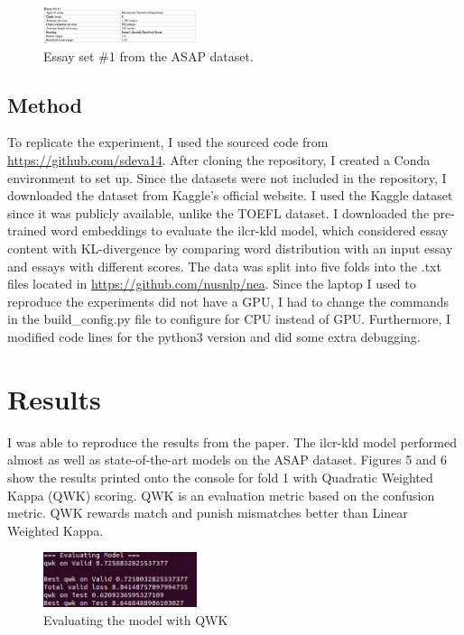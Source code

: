 \documentclass[11pt]{article}
\begin{document}
\begin{figure}
\centering
\includegraphics[width=0.4\textwidth]{essay_set.png}
\caption{Essay set \#1 from the ASAP dataset.}
\end{figure}

\subsection{Method}
To replicate the experiment, I used the sourced code from \url{https://github.com/sdeva14}.
After cloning the repository, I created a Conda environment to set up. Since the datasets were not included in the repository, I downloaded the dataset from Kaggle’s official website. I used the Kaggle dataset since it was publicly available, unlike the TOEFL dataset. I downloaded the pre-trained word embeddings to evaluate the ilcr-kld model, which considered essay content with KL-divergence by comparing word distribution with an input essay and essays with different scores. The data was split into five folds into the .txt files located in \url{https://github.com/nusnlp/nea}. Since the laptop I used to reproduce the experiments did not have a GPU, I had to change the commands in the build\_config.py file to configure for CPU instead of GPU. Furthermore, I modified code lines for the python3 version and did some extra debugging. 

\section{Results}
I was able to reproduce the results from the paper. The ilcr-kld model performed almost as well as state-of-the-art models on the ASAP dataset. Figures 5 and 6 show the results printed onto the console for fold 1 with Quadratic Weighted Kappa (QWK) scoring. QWK is an evaluation metric based on the confusion metric. QWK rewards match and punish mismatches better than Linear Weighted Kappa. 

\begin{figure}
\centering
\includegraphics[width=0.4\textwidth]{results1.png}
\caption{Evaluating the model with QWK}
\end{figure}
\end{document}
